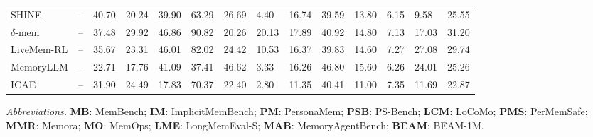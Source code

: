 \begin{table}[!t]
\begin{threeparttable}
\begin{adjustbox}{max width=\textwidth}
\begin{tabular}{
        l
        c
        Y Y Y Y Y Y Y Y Y Y Y Y
    }
    SHINE
    & --
    & 40.70 & 20.24
    & 39.90 & 63.29 & 26.69
    & 4.40 & 16.74 & 39.59
    & 13.80 & 6.15 & 9.58
    & 25.55
    \\

    $\delta$-mem
    & --
    & 37.48 & 29.92
    & 46.86 & 90.82 & 20.26
    & 20.13 & 17.89 & 40.92
    & 14.80 & 7.13 & 17.03
    & 31.20
    \\

    LiveMem-RL
    & --
    & 35.67 & 23.31
    & 46.01 & 82.02 & 24.42
    & 10.53 & 16.37 & 39.83
    & 14.60 & 7.27 & 27.08
    & 29.74
    \\

    MemoryLLM
    & --
    & 22.71 & 17.76
    & 41.09 & 37.41 & 46.62
    & 3.33 & 16.26 & 46.80
    & 15.60 & 6.26 & 24.01
    & 25.26
    \\

    ICAE
    & --
    & 31.90 & 24.49
    & 17.83 & 70.37 & 22.40
    & 2.80 & 11.35 & 40.41
    & 11.00 & 7.35 & 11.69
    & 22.87
    \\

    \bottomrule[1.15pt]

    \end{tabular}
    \end{adjustbox}

    \vspace{2pt}

    \begin{minipage}{\textwidth}
        \footnotesize
        \textit{Abbreviations.}
        \textbf{MB}: MemBench;
        \textbf{IM}: ImplicitMemBench;
        \textbf{PM}: PersonaMem;
        \textbf{PSB}: PS-Bench;
        \textbf{LCM}: LoCoMo;
        \textbf{PMS}: PerMemSafe;
        \textbf{MMR}: Memora;
        \textbf{MO}: MemOps;
        \textbf{LME}: LongMemEval-S;
        \textbf{MAB}: MemoryAgentBench;
        \textbf{BEAM}: BEAM-1M.
    \end{minipage}

    \end{threeparttable}
    \vspace{-0.4cm}
\end{table}